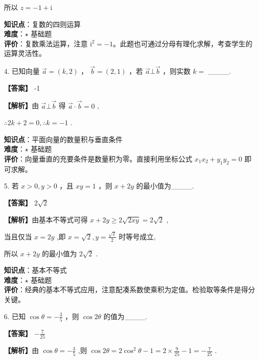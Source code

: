 \documentclass[10pt]{article}
\begin{document}
所以 \(z =  - 1 + \mathrm{i}\)

\begin{analysisbox}[考点分析]
\textbf{知识点}：复数的四则运算\\
\textbf{难度}：\(\star\) 基础题\\
\textbf{评价}：复数乘法运算，注意 \(\mathrm{i}^2 = -1\)。此题也可通过分母有理化求解，考查学生的运算灵活性。
\end{analysisbox}

4. 已知向量 \(\overrightarrow{a} = \left( {k,2}\right)\) ， \(\overrightarrow{b} = \left( {2,1}\right)\) ，若 \(\overrightarrow{a}\bot \overrightarrow{b}\) ，则实数 \(k =\) \_\_\_\_.

\textbf{【答案】} -1

\textbf{【解析】}由 \(\overrightarrow{a} \bot  \overrightarrow{b}\) 得 \(\overrightarrow{a} \cdot  \overrightarrow{b} = 0\) ,

\(\therefore {2k} + 2 = 0,\therefore k =  - 1\) .

\begin{analysisbox}[考点分析]
\textbf{知识点}：平面向量的数量积与垂直条件\\
\textbf{难度}：\(\star\) 基础题\\
\textbf{评价}：向量垂直的充要条件是数量积为零。直接利用坐标公式 \(x_1x_2 + y_1y_2 = 0\) 即可求解。
\end{analysisbox}

5. 若 \(x > 0,y > 0\) ，且 \({xy} = 1\) ，则 \(x + {2y}\) 的最小值为\_\_\_\_.

\textbf{【答案】} \(2\sqrt{2}\)

\textbf{【解析】}由基本不等式可得 \(x + {2y} \geq  2\sqrt{2xy} = 2\sqrt{2}\) ,

当且仅当 \(x = {2y}\) ,即 \(x = \sqrt{2},y = \frac{\sqrt{2}}{2}\) 时等号成立,

所以 \(x + {2y}\) 的最小值为 \(2\sqrt{2}\) .

\begin{analysisbox}[考点分析]
\textbf{知识点}：基本不等式\\
\textbf{难度}：\(\star\) 基础题\\
\textbf{评价}：经典的基本不等式应用，注意配凑系数使乘积为定值。检验取等条件是得分关键。
\end{analysisbox}

6. 已知 \(\cos \theta  =  - \frac{3}{5}\) ，则 \(\cos {2\theta }\) 的值为\_\_\_\_.

\textbf{【答案】} \(- \frac{7}{25}\)

\textbf{【解析】}由 \(\cos \theta  =  - \frac{3}{5}\) ,则 \(\cos {2\theta } = 2{\cos }^{2}\theta  - 1 = 2 \times  \frac{9}{25} - 1 =  - \frac{7}{25}\) .
\end{document}
